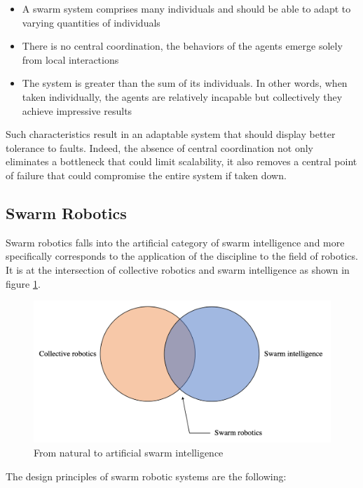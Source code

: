 \begin{itemize}
    \item A swarm system comprises many individuals and should be able to adapt to varying quantities of individuals
    \item There is no central coordination, the behaviors of the agents emerge solely from local interactions
    \item The system is greater than the sum of its individuals. In other words, when taken individually, the agents are relatively incapable but collectively they achieve impressive results   
\end{itemize}

Such characteristics result in an adaptable system that should display better tolerance to faults. Indeed, the absence of central coordination not only eliminates a bottleneck that could limit scalability, it also removes a central point of failure that could compromise the entire system if taken down.

\subsection{Swarm Robotics}
\label{sec:designprinciples}
Swarm robotics falls into the artificial category of swarm intelligence and more specifically corresponds to the application of the discipline to the field of robotics. It is at the intersection of collective robotics and swarm intelligence as shown in figure \ref{venne}. 

\begin{figure}[h]
    \centering
    \includegraphics[width=0.99\columnwidth]{images/vennes.png}
    \caption{From natural to artificial swarm intelligence}
    \label{venne}
\end{figure}

The design principles of swarm robotic systems are the following: 


